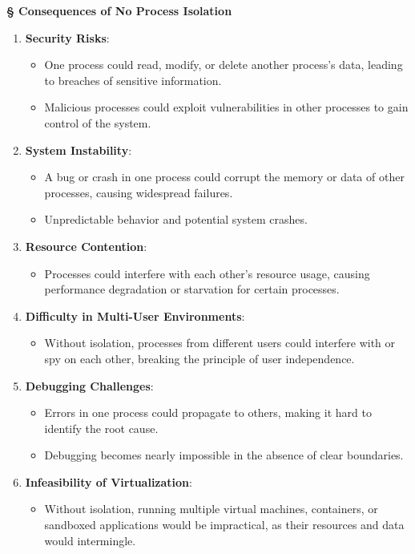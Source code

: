 \documentclass[a4paper]{book}
\newcommand{\sfbf}[1]{{\normalsize\textsf{\textbf{§ #1}}}}
\begin{document}
\sfbf{Consequences of No Process Isolation}

\begin{enumerate}
\item 
\textbf{Security Risks}:
\begin{itemize}
\item 
One process could read, modify, or delete another process's data, leading to breaches of sensitive information.

\item 
Malicious processes could exploit vulnerabilities in other processes to gain control of the system.

\end{itemize}

\item 
\textbf{System Instability}:
\begin{itemize}
\item 
A bug or crash in one process could corrupt the memory or data of other processes, causing widespread failures.

\item 
Unpredictable behavior and potential system crashes.

\end{itemize}

\item 
\textbf{Resource Contention}:
\begin{itemize}
\item 
Processes could interfere with each other’s resource usage, causing performance degradation or starvation for certain processes.

\end{itemize}

\item 
\textbf{Difficulty in Multi-User Environments}:
\begin{itemize}
\item 
Without isolation, processes from different users could interfere with or spy on each other, breaking the principle of user independence.

\end{itemize}

\item 
\textbf{Debugging Challenges}:
\begin{itemize}
\item 
Errors in one process could propagate to others, making it hard to identify the root cause.

\item 
Debugging becomes nearly impossible in the absence of clear boundaries.

\end{itemize}

\item 
\textbf{Infeasibility of Virtualization}:
\begin{itemize}
\item 
Without isolation, running multiple virtual machines, containers, or sandboxed applications would be impractical, as their resources and data would intermingle.

\end{itemize}

\end{enumerate}
\end{document}
